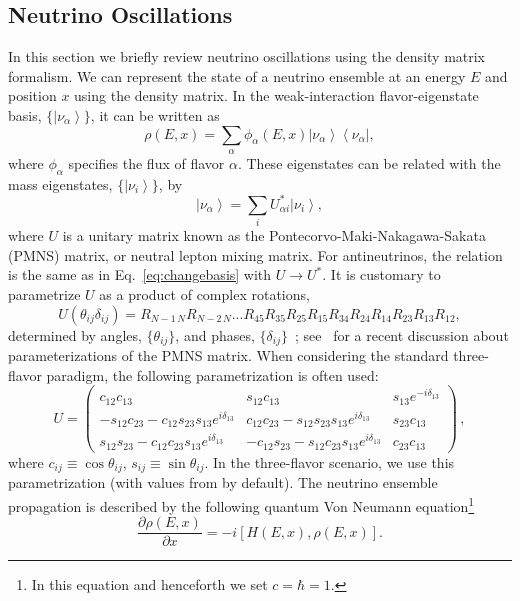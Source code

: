 \documentclass[3p,12pt]{elsarticle}
\newcommand{\bra}[1]{\ensuremath{\left\langle#1\right|}}
\newcommand{\ket}[1]{\ensuremath{\left|#1\right\rangle}}
\newcommand{\pa}[2]{\frac{\partial #1}{\partial #2}}
\begin{document}
\subsection{Neutrino Oscillations} 
In this section we briefly review neutrino oscillations
using the density matrix formalism.
We can represent the state of a neutrino ensemble at an energy $E$
and position $x$ using the density matrix. In the weak-interaction flavor-eigenstate basis,
$\{\ket{\nu_\alpha}\}$,  it can be written as
\begin{equation}
\rho(E,x) = \sum_\alpha \phi_\alpha(E,x) \ket{\nu_\alpha}\bra{\nu_\alpha} , 
\label{eq:state}
\end{equation}
where $\phi_\alpha$ specifies the flux of flavor $\alpha$.
These eigenstates can be related with the mass eigenstates,  $\{ \ket{\nu_i}  \}$, by
\begin{equation}
\ket{\nu_\alpha} = \sum_i U^*_{\alpha i} \ket{\nu_i} ,
\label{eq:changebasis}
\end{equation}
where $U$ is a unitary matrix known as the Pontecorvo-Maki-Nakagawa-Sakata (PMNS)
matrix, or neutral lepton mixing matrix. For antineutrinos, the relation
is the same as in 
Eq.~\eqref{eq:changebasis} with $U \to U^*$.
It is customary to parametrize $U$ as a product of complex rotations,
\begin{equation}
\label{eq:mixing}
U(\theta_{ij}\delta_{ij})=R_{N-1\, N} R_{N-2\, N} ... R_{45} R_{35} R_{25} R_{15}
R_{34} R_{24} R_{14} R_{23} R_{13} R_{12}, 
\end{equation}
determined by angles, $\{\theta_{ij}\}$, and phases, $\{ \delta_{ij}
\}$~\cite{SQUIDS, SQUIDSupdate}; see~\cite{Denton:2020igp} for a recent discussion about parameterizations of the PMNS matrix.
When considering the standard three-flavor paradigm,
the following parametrization is often used:
\begin{equation}
U
=
\begin{pmatrix}
c_{12} c_{13} & s_{12} c_{13} & s_{13} e^{-i\delta_{13}} \\ 
- s_{12} c_{23} - c_{12} s_{23} s_{13} e^{i\delta_{13}} & c_{12} c_{23} - s_{12} s_{23} s_{13} e^{i\delta_{13}} & s_{23} c_{13} \\
s_{12}s_{23} -c_{12}c_{23}s_{13}e^{i\delta_{13}} & - c_{12} s_{23} - s_{12} c_{23} s_{13} e^{i\delta_{13}} & c_{23} c_{13}
\end{pmatrix}
\,,
\label{eq:U}
\end{equation}
where $c_{ij} \equiv \cos \theta_{ij}$, $s_{ij} \equiv \sin \theta_{ij}$. In the
three-flavor scenario, we use this parametrization (with
values from \citep{Esteban:2020cvm} by default).
The neutrino ensemble propagation is
described by the following quantum Von Neumann equation\footnote{In this equation and henceforth we set $c = \hbar = 1$.} 
\begin{equation}
\pa{\rho(E,x)}{x} = -i [ H (E,x), \rho(E,x) ].
\label{eq:schrodinger}
\end{equation}
\end{document}
